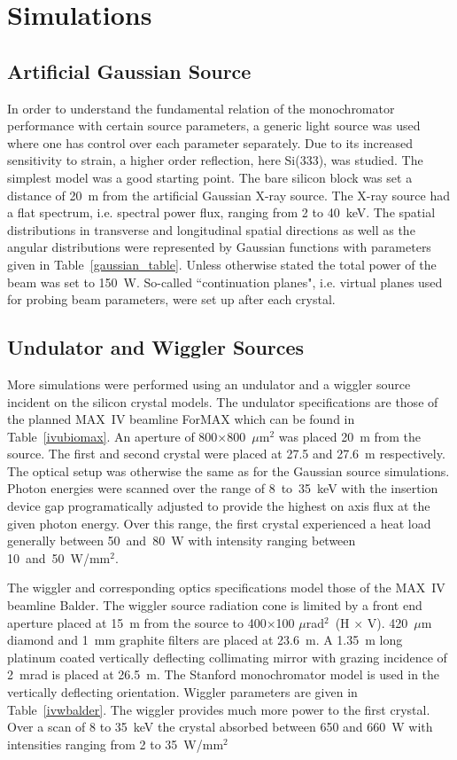 \documentclass{iucr}
\begin{document}
\section{Simulations}

\subsection{Artificial Gaussian Source}
In order to understand the fundamental relation of the monochromator performance with certain source parameters, a generic light source was used where one has control over each parameter separately. Due to its increased sensitivity to strain, a higher order reflection, here Si(333), was studied. The simplest model was a good starting point. The bare silicon block was set a distance of 20~m from the artificial Gaussian X-ray source. The X-ray source had a flat spectrum, i.e. spectral power flux, ranging from 2 to 40~keV. The spatial distributions in transverse and longitudinal spatial directions as well as the angular distributions were represented by Gaussian functions with parameters given in Table~\ref{gaussian_table}. Unless otherwise stated the total power of the beam was set to 150~W. So-called ``continuation planes", i.e. virtual planes used for probing beam parameters, were set up after each crystal.

\subsection{Undulator and Wiggler Sources}\label{undulatorsource}
More simulations were performed using an undulator and a wiggler source incident on the silicon crystal models. The undulator specifications are those of the planned MAX~IV beamline ForMAX which can be found in Table~\ref{ivubiomax}. An aperture of 800$\times$800~$\mu$m$^2$ was placed 20~m from the source. The first and second crystal were placed at 27.5 and 27.6~m respectively. The optical setup was otherwise the same as for the Gaussian source simulations. Photon energies were scanned over the range of 8~to~35~keV with the insertion device gap programatically adjusted to provide the highest on axis flux at the given photon energy. Over this range, the first crystal experienced a heat load generally between 50~and~80~W with intensity ranging between 10~and~50~W/mm$^2$. 

The wiggler and corresponding optics specifications model those of the MAX~IV beamline Balder. The wiggler source radiation cone is limited by a front end aperture placed at 15~m from the source to 400$\times$100 $\mu$rad$^2$~(H $\times$ V). 420~$\mu$m diamond and 1~mm graphite filters are placed at 23.6~m. A 1.35~m long platinum coated vertically deflecting collimating mirror with grazing incidence of 2~mrad is placed at 26.5~m. The Stanford monochromator model is used in the vertically deflecting orientation. Wiggler parameters are given in Table~\ref{ivwbalder}. The wiggler provides much more power to the first crystal. Over a scan of 8 to 35~keV the crystal absorbed between 650 and 660~W with intensities ranging from 2 to 35~W/mm$^2$
\end{document}
